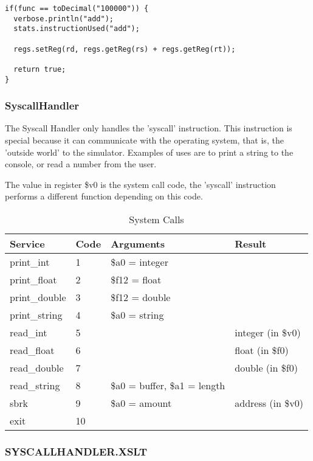 \begin{verbatim}
if(func == toDecimal("100000")) {
  verbose.println("add");
  stats.instructionUsed("add");

  regs.setReg(rd, regs.getReg(rs) + regs.getReg(rt));

  return true;
}
\end{verbatim}


\subsubsection{SyscallHandler}

The Syscall Handler only handles the 'syscall' instruction. This instruction is special because it can communicate with the operating system, that is, the 'outside world' to the simulator. Examples of uses are to print a string to the console, or read a number from the user.

The value in register \$v0 is the system call code, the 'syscall' instruction performs a different function depending on this code.

\begin{table}
\begin{center}
	\begin{tabular}{|l|l|l|l|}
	\hline
	Service			&	Code	&	Arguments				&	Result \\
	\hline
	print\_int		&	1		&	\$a0 = integer			& \\
	print\_float	&	2		&	\$f12 = float			& \\
	print\_double	&	3		&	\$f12 = double			& \\
	print\_string	&	4		&	\$a0 = string			& \\
	read\_int		&	5		&							&	integer (in \$v0) \\
	read\_float		&	6		&							&	float (in \$f0) \\
	read\_double	&	7		&							&	double (in \$f0) \\
	read\_string	&	8		&	\$a0 = buffer, \$a1 = length	& \\
	sbrk			&	9		&	\$a0 = amount			&	address (in \$v0)  \\
	exit			&	10		&							&	\\
	\hline
	\end{tabular}
\caption{System Calls}
\label{tab:SystemCalls}
\end{center}
\end{table}


\subsubsection{SYSCALLHANDLER.XSLT}

